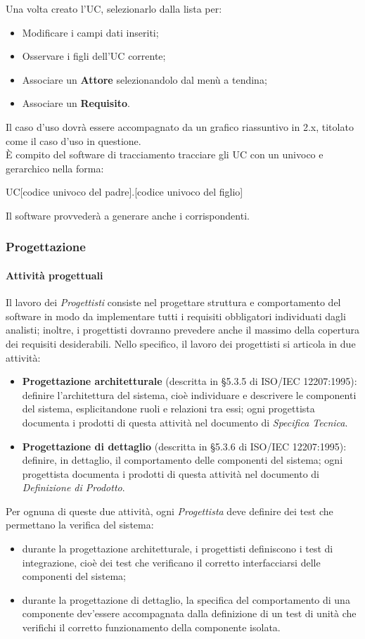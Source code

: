       Una volta creato l'UC, selezionarlo dalla lista per:
      \begin{itemize}
        \item Modificare i campi dati inseriti;
        \item Osservare i figli dell'UC corrente;
        \item Associare un \textbf{Attore} selezionandolo dal menù a tendina;
        \item Associare un \textbf{Requisito}.
      \end{itemize}
      Il caso d'uso dovrà essere accompagnato da un grafico riassuntivo in 2.x, titolato come il caso d'uso in questione.\\
      È compito del software di tracciamento tracciare gli UC con un  univoco e gerarchico nella forma:
      \begin{center}
        UC[codice univoco del padre].[codice univoco del figlio]
      \end{center}
      Il software provvederà a generare anche i   corrispondenti.
\subsubsection{Progettazione}
	\paragraph{Attività progettuali} Il lavoro dei \textit{Progettisti} consiste nel progettare struttura e comportamento del software in modo da implementare tutti i requisiti obbligatori individuati dagli analisti; inoltre, i progettisti dovranno prevedere anche il massimo della copertura dei requisiti desiderabili. Nello specifico, il lavoro dei progettisti si articola in due attività:
\begin{itemize}
\item \textbf{Progettazione architetturale} (descritta in §5.3.5 di ISO/IEC 12207:1995): definire l’architettura del sistema, cioè individuare e descrivere le componenti del sistema, esplicitandone ruoli e relazioni tra essi; ogni progettista documenta i prodotti di questa attività nel documento di \emph{Specifica Tecnica}.
\item \textbf{Progettazione di dettaglio} (descritta in §5.3.6 di ISO/IEC 12207:1995): definire, in dettaglio, il comportamento delle componenti del sistema; ogni progettista documenta i prodotti di questa attività nel documento di
\emph{Definizione di Prodotto}.
\end{itemize}
Per ognuna di queste due attività, ogni \textit{Progettista} deve definire dei test che permettano la verifica del sistema:
\begin{itemize}
\item durante la progettazione architetturale, i progettisti definiscono i test di integrazione, cioè dei test che verificano il corretto interfacciarsi delle componenti del sistema;
\item durante la progettazione di dettaglio, la specifica del comportamento di una componente dev’essere accompagnata dalla definizione di un test di unità che verifichi il corretto funzionamento della componente isolata.
\end{itemize}

